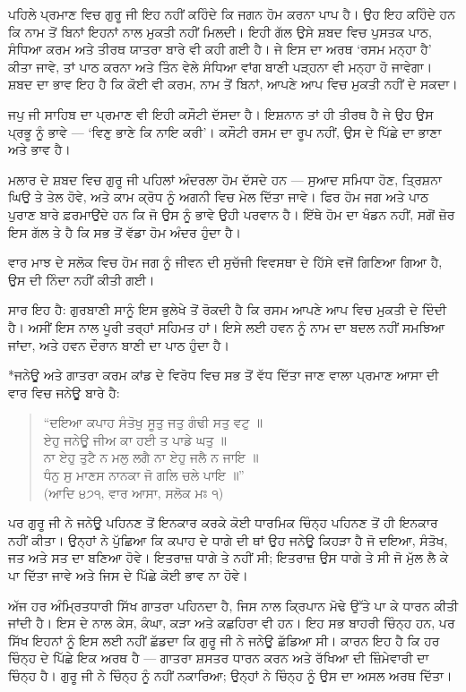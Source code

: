 \documentclass[12pt,a5paper,twoside]{book}  %
\makeatletter
\renewcommand\section{\@startsection{section}{1}{0pt}{1.2em}{0.6em}{\punjabifont\Large\bfseries}}%
\makeatother
\begin{document}
{ਪਹਿਲੇ ਪ੍ਰਮਾਣ ਵਿਚ ਗੁਰੂ ਜੀ ਇਹ ਨਹੀਂ ਕਹਿੰਦੇ ਕਿ ਜਗਨ ਹੋਮ ਕਰਨਾ ਪਾਪ ਹੈ। ਉਹ ਇਹ ਕਹਿੰਦੇ ਹਨ ਕਿ ਨਾਮ ਤੋਂ ਬਿਨਾਂ ਇਹਨਾਂ ਨਾਲ ਮੁਕਤੀ ਨਹੀਂ ਮਿਲਦੀ। ਇਹੀ ਗੱਲ ਉਸੇ ਸ਼ਬਦ ਵਿਚ ਪੁਸਤਕ ਪਾਠ, ਸੰਧਿਆ ਕਰਮ ਅਤੇ ਤੀਰਥ ਯਾਤਰਾ ਬਾਰੇ ਵੀ ਕਹੀ ਗਈ ਹੈ। ਜੇ ਇਸ ਦਾ ਅਰਥ ‘ਰਸਮ ਮਨ੍ਹਾ ਹੈ’ ਕੀਤਾ ਜਾਵੇ, ਤਾਂ ਪਾਠ ਕਰਨਾ ਅਤੇ ਤਿੰਨ ਵੇਲੇ ਸੰਧਿਆ ਵਾਂਗ ਬਾਣੀ ਪੜ੍ਹਨਾ ਵੀ ਮਨ੍ਹਾ ਹੋ ਜਾਵੇਗਾ। ਸ਼ਬਦ ਦਾ ਭਾਵ ਇਹ ਹੈ ਕਿ ਕੋਈ ਵੀ ਕਰਮ, ਨਾਮ ਤੋਂ ਬਿਨਾਂ, ਆਪਣੇ ਆਪ ਵਿਚ ਮੁਕਤੀ ਨਹੀਂ ਦੇ ਸਕਦਾ।

ਜਪੁ ਜੀ ਸਾਹਿਬ ਦਾ ਪ੍ਰਮਾਣ ਵੀ ਇਹੀ ਕਸੌਟੀ ਦੱਸਦਾ ਹੈ। ਇਸ਼ਨਾਨ ਤਾਂ ਹੀ ਤੀਰਥ ਹੈ ਜੇ ਉਹ ਉਸ ਪ੍ਰਭੂ ਨੂੰ ਭਾਵੇ — ‘ਵਿਣੁ ਭਾਣੇ ਕਿ ਨਾਇ ਕਰੀ’। ਕਸੌਟੀ ਰਸਮ ਦਾ ਰੂਪ ਨਹੀਂ, ਉਸ ਦੇ ਪਿੱਛੇ ਦਾ ਭਾਣਾ ਅਤੇ ਭਾਵ ਹੈ।

ਮਲਾਰ ਦੇ ਸ਼ਬਦ ਵਿਚ ਗੁਰੂ ਜੀ ਪਹਿਲਾਂ ਅੰਦਰਲਾ ਹੋਮ ਦੱਸਦੇ ਹਨ — ਸੁਆਦ ਸਮਿਧਾ ਹੋਣ, ਤ੍ਰਿਸ਼ਨਾ ਘਿਉ ਤੇ ਤੇਲ ਹੋਵੇ, ਅਤੇ ਕਾਮ ਕ੍ਰੋਧ ਨੂੰ ਅਗਨੀ ਵਿਚ ਮੇਲ ਦਿੱਤਾ ਜਾਵੇ। ਫਿਰ ਹੋਮ ਜਗ ਅਤੇ ਪਾਠ ਪੁਰਾਣ ਬਾਰੇ ਫ਼ਰਮਾਉਂਦੇ ਹਨ ਕਿ ਜੋ ਉਸ ਨੂੰ ਭਾਵੇ ਉਹੀ ਪਰਵਾਨ ਹੈ। ਇੱਥੇ ਹੋਮ ਦਾ ਖੰਡਨ ਨਹੀਂ, ਸਗੋਂ ਜ਼ੋਰ ਇਸ ਗੱਲ ਤੇ ਹੈ ਕਿ ਸਭ ਤੋਂ ਵੱਡਾ ਹੋਮ ਅੰਦਰ ਹੁੰਦਾ ਹੈ।

ਵਾਰ ਮਾਝ ਦੇ ਸਲੋਕ ਵਿਚ ਹੋਮ ਜਗ ਨੂੰ ਜੀਵਨ ਦੀ ਸੁਚੱਜੀ ਵਿਵਸਥਾ ਦੇ ਹਿੱਸੇ ਵਜੋਂ ਗਿਣਿਆ ਗਿਆ ਹੈ, ਉਸ ਦੀ ਨਿੰਦਾ ਨਹੀਂ ਕੀਤੀ ਗਈ।

ਸਾਰ ਇਹ ਹੈ: ਗੁਰਬਾਣੀ ਸਾਨੂੰ ਇਸ ਭੁਲੇਖੇ ਤੋਂ ਰੋਕਦੀ ਹੈ ਕਿ ਰਸਮ ਆਪਣੇ ਆਪ ਵਿਚ ਮੁਕਤੀ ਦੇ ਦਿੰਦੀ ਹੈ। ਅਸੀਂ ਇਸ ਨਾਲ ਪੂਰੀ ਤਰ੍ਹਾਂ ਸਹਿਮਤ ਹਾਂ। ਇਸੇ ਲਈ ਹਵਨ ਨੂੰ ਨਾਮ ਦਾ ਬਦਲ ਨਹੀਂ ਸਮਝਿਆ ਜਾਂਦਾ, ਅਤੇ ਹਵਨ ਦੌਰਾਨ ਬਾਣੀ ਦਾ ਪਾਠ ਹੁੰਦਾ ਹੈ।

\section*{ਜਨੇਊ ਅਤੇ ਗਾਤਰਾ}
ਕਰਮ ਕਾਂਡ ਦੇ ਵਿਰੋਧ ਵਿਚ ਸਭ ਤੋਂ ਵੱਧ ਦਿੱਤਾ ਜਾਣ ਵਾਲਾ ਪ੍ਰਮਾਣ ਆਸਾ ਦੀ ਵਾਰ ਵਿਚ ਜਨੇਊ ਬਾਰੇ ਹੈ:
\begin{quote}
“ਦਇਆ ਕਪਾਹ ਸੰਤੋਖੁ ਸੂਤੁ ਜਤੁ ਗੰਢੀ ਸਤੁ ਵਟੁ ॥ \\
ਏਹੁ ਜਨੇਊ ਜੀਅ ਕਾ ਹਈ ਤ ਪਾਡੇ ਘਤੁ ॥ \\
ਨਾ ਏਹੁ ਤੁਟੈ ਨ ਮਲੁ ਲਗੈ ਨਾ ਏਹੁ ਜਲੈ ਨ ਜਾਇ ॥ \\
ਧੰਨੁ ਸੁ ਮਾਣਸ ਨਾਨਕਾ ਜੋ ਗਲਿ ਚਲੇ ਪਾਇ ॥” \\
(ਆਦਿ ੪੭੧, ਵਾਰ ਆਸਾ, ਸਲੋਕ ਮਃ ੧)
\end{quote}
ਪਰ ਗੁਰੂ ਜੀ ਨੇ ਜਨੇਊ ਪਹਿਨਣ ਤੋਂ ਇਨਕਾਰ ਕਰਕੇ ਕੋਈ ਧਾਰਮਿਕ ਚਿੰਨ੍ਹ ਪਹਿਨਣ ਤੋਂ ਹੀ ਇਨਕਾਰ ਨਹੀਂ ਕੀਤਾ। ਉਨ੍ਹਾਂ ਨੇ ਪੁੱਛਿਆ ਕਿ ਕਪਾਹ ਦੇ ਧਾਗੇ ਦੀ ਥਾਂ ਉਹ ਜਨੇਊ ਕਿਹੜਾ ਹੈ ਜੋ ਦਇਆ, ਸੰਤੋਖ, ਜਤ ਅਤੇ ਸਤ ਦਾ ਬਣਿਆ ਹੋਵੇ। ਇਤਰਾਜ਼ ਧਾਗੇ ਤੇ ਨਹੀਂ ਸੀ; ਇਤਰਾਜ਼ ਉਸ ਧਾਗੇ ਤੇ ਸੀ ਜੋ ਮੁੱਲ ਲੈ ਕੇ ਪਾ ਦਿੱਤਾ ਜਾਵੇ ਅਤੇ ਜਿਸ ਦੇ ਪਿੱਛੇ ਕੋਈ ਭਾਵ ਨਾ ਹੋਵੇ।

ਅੱਜ ਹਰ ਅੰਮ੍ਰਿਤਧਾਰੀ ਸਿੱਖ ਗਾਤਰਾ ਪਹਿਨਦਾ ਹੈ, ਜਿਸ ਨਾਲ ਕ੍ਰਿਪਾਨ ਮੋਢੇ ਉੱਤੇ ਪਾ ਕੇ ਧਾਰਨ ਕੀਤੀ ਜਾਂਦੀ ਹੈ। ਇਸ ਦੇ ਨਾਲ ਕੇਸ, ਕੰਘਾ, ਕੜਾ ਅਤੇ ਕਛਹਿਰਾ ਵੀ ਹਨ। ਇਹ ਸਭ ਬਾਹਰੀ ਚਿੰਨ੍ਹ ਹਨ, ਪਰ ਸਿੱਖ ਇਹਨਾਂ ਨੂੰ ਇਸ ਲਈ ਨਹੀਂ ਛੱਡਦਾ ਕਿ ਗੁਰੂ ਜੀ ਨੇ ਜਨੇਊ ਛੱਡਿਆ ਸੀ। ਕਾਰਨ ਇਹ ਹੈ ਕਿ ਹਰ ਚਿੰਨ੍ਹ ਦੇ ਪਿੱਛੇ ਇਕ ਅਰਥ ਹੈ — ਗਾਤਰਾ ਸ਼ਸਤਰ ਧਾਰਨ ਕਰਨ ਅਤੇ ਰੱਖਿਆ ਦੀ ਜ਼ਿੰਮੇਵਾਰੀ ਦਾ ਚਿੰਨ੍ਹ ਹੈ। ਗੁਰੂ ਜੀ ਨੇ ਚਿੰਨ੍ਹ ਨੂੰ ਨਹੀਂ ਨਕਾਰਿਆ; ਉਨ੍ਹਾਂ ਨੇ ਚਿੰਨ੍ਹ ਨੂੰ ਉਸ ਦਾ ਅਸਲ ਅਰਥ ਦਿੱਤਾ।

}
\end{document}
